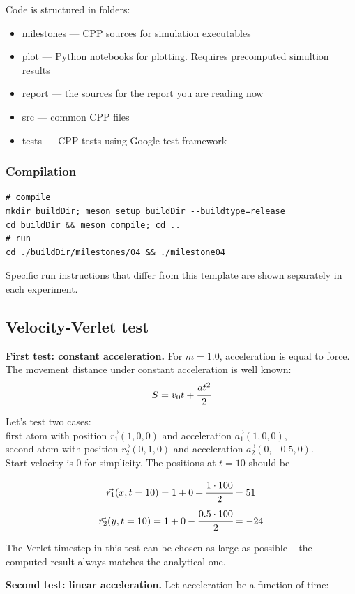 \documentclass[12pt,a4paper]{article}
\newcommand{\mat}[1]{\vec{#1}}
\begin{document}
Code is structured in folders:
\begin{itemize}
	\item milestones --- CPP sources for simulation executables
	\item plot --- Python notebooks for plotting. Requires precomputed simultion results
	\item report --- the sources for the report you are reading now
	\item src --- common CPP files
	\item tests --- CPP tests using Google test framework
\end{itemize}

\subsubsection*{Compilation}
\begin{verbatim}
# compile
mkdir buildDir; meson setup buildDir --buildtype=release
cd buildDir && meson compile; cd ..
# run
cd ./buildDir/milestones/04 && ./milestone04
\end{verbatim}

Specific run instructions that differ from this template are shown separately in each experiment.

\subsection*{Velocity-Verlet test}

{\bf First test: constant acceleration.} For $m=1.0$, acceleration is equal to force. The movement distance under constant acceleration is well known: \[ S = v_0 t + \cfrac{at^2}{2} \]

Let's test two cases:\\
first atom with position $\mat{r_1}(1, 0, 0)$ and acceleration $\mat{a_1}(1, 0, 0)$,\\
second atom with position $\mat{r_2}(0, 1, 0)$ and acceleration $\mat{a_2}(0, -0.5, 0)$.\\
Start velocity is 0 for simplicity. The positions at $t = 10$ should be

\[ \mat{r_1}(x, t=10) = 1 + 0 + \cfrac{1 \cdot 100}{2} = 51 \]
\[ \mat{r_2}(y, t=10) = 1 + 0 - \cfrac{0.5 \cdot 100}{2} = -24 \]

The Verlet timestep in this test can be chosen as large as possible -- the computed result always matches the analytical one.

{\bf Second test: linear acceleration.} Let acceleration be a function of time:
\end{document}
